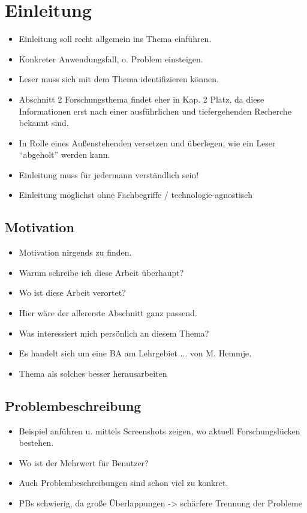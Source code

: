 \section{Einleitung}
\label{sec1:intro}
\begin{itemize}
    \item Einleitung soll recht allgemein ins Thema einführen.
    \item Konkreter Anwendungsfall, o. Problem einsteigen.
    \item Leser muss sich mit dem Thema identifizieren können.
    \item Abschnitt 2 Forschungsthema findet eher in Kap. 2 Platz, da diese Informationen erst nach einer ausführlichen und tiefergehenden Recherche bekannt sind.
    \item In Rolle eines Außenstehenden versetzen und überlegen, wie ein Leser \enquote{abgeholt} werden kann.
    \item Einleitung muss für jedermann verständlich sein!
    \item Einleitung möglichst ohne Fachbegriffe / technologie-agnostisch
\end{itemize}

\subsection{Motivation}
\label{sec1:intro:subsec:motivation}
\begin{itemize}
    \item Motivation nirgends zu finden.
    \item Warum schreibe ich diese Arbeit überhaupt?
    \item Wo ist diese Arbeit verortet?
    \item Hier wäre der allererste Abschnitt ganz passend.
    \item Was interessiert mich persönlich an diesem Thema?
    \item Es handelt sich um eine BA am Lehrgebiet ... von M. Hemmje.
    \item Thema als solches besser herausarbeiten
\end{itemize}

\subsection{Problembeschreibung}
\label{sec1:intro:subsec:problems}
\begin{itemize}
    \item Beispiel anführen u. mittels Screenshots zeigen, wo aktuell Forschungslücken bestehen.
    \item Wo ist der Mehrwert für Benutzer?
    \item Auch Problembeschreibungen sind schon viel zu konkret.
    \item PBs schwierig, da große Überlappungen -> schärfere Trennung der Probleme
\end{itemize}


